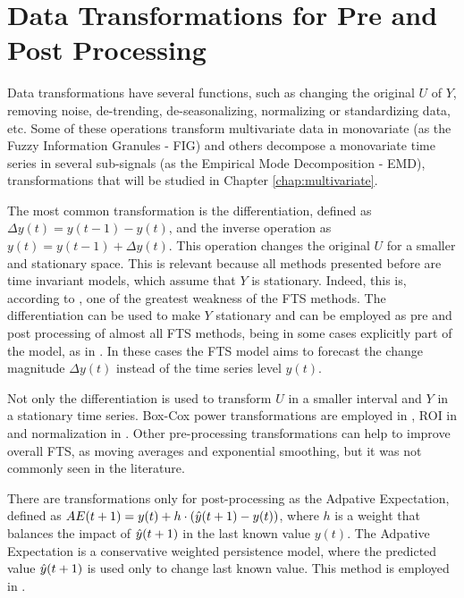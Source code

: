 \section{Data Transformations for Pre and Post Processing}
\label{sec:fts_transformations}


Data transformations have several functions, such as changing the original $U$ of $Y$, removing noise, de-trending, de-seasonalizing, normalizing or standardizing data, etc. Some of these operations transform multivariate data in monovariate (as the Fuzzy Information Granules - FIG) and others decompose a monovariate time series in several sub-signals (as the Empirical Mode Decomposition - EMD), transformations that will be studied in Chapter \ref{chap:multivariate}.

The most common transformation is the differentiation, defined as $\Delta y(t) = y(t-1) - y(t)$, and the inverse operation as $y(t) = y(t-1) + \Delta y(t)$. This operation changes the original $U$ for a smaller and stationary space. This is relevant because all methods presented before are time invariant models, which assume that $Y$ is stationary. Indeed, this is, according to \cite{Duru2012}, one of the greatest weakness of the FTS methods. The differentiation can be used to make $Y$ stationary and can be employed as pre and post processing of almost all FTS methods, being in some cases explicitly part of the model, as in \cite{Cheng2011, Lee2011, Sadaei2016}. In these cases the FTS model aims to forecast the change magnitude $\Delta y(t)$ instead of the time series level $y(t)$.

Not only the differentiation is used to transform $U$ in a smaller interval and $Y$ in a stationary time series. Box-Cox power transformations are employed in  \citep{Lee2013}, ROI in \cite{Sadaei2014a, Moyse2016} and normalization in \cite{Tran2018}. Other pre-processing transformations can help to improve overall FTS, as moving averages and exponential smoothing, but it was not commonly seen in the literature. 

There are transformations only for post-processing as the Adpative Expectation, defined as $AE(t+1) = y(t) + h\cdot(\hat{y}(t+1) - y(t))$, where $h$ is a weight that balances the impact of $\hat{y}(t+1)$ in the last known value $y(t)$. The Adpative Expectation is a conservative weighted persistence model, where the predicted value $\hat{y}(t+1)$ is used only to change last known value. This method is employed in \cite{Cheng2008, Huang2011, Enayatifar2013, sadaei2014short, Singh2015, Sadaei2016, Ye2016, Yang2017, Bose2017}.

